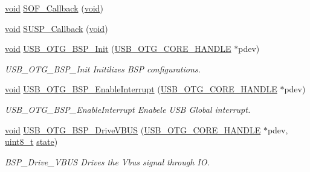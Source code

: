 \begin{DoxyCompactItemize}
\item 
\hyperlink{group___n_a_m_e_ga18028b8badbf1ea7e704ccac3c488e82}{void} \hyperlink{group___p_i_o_s___u_s_b_gaa3a23e7d4ec85e79cf28841529f081be}{S\-O\-F\-\_\-\-Callback} (\hyperlink{group___n_a_m_e_ga18028b8badbf1ea7e704ccac3c488e82}{void})
\item 
\hyperlink{group___n_a_m_e_ga18028b8badbf1ea7e704ccac3c488e82}{void} \hyperlink{group___p_i_o_s___u_s_b_gac123415bdaa5f7dc62947bd086bccebd}{S\-U\-S\-P\-\_\-\-Callback} (\hyperlink{group___n_a_m_e_ga18028b8badbf1ea7e704ccac3c488e82}{void})
\item 
\hyperlink{group___n_a_m_e_ga18028b8badbf1ea7e704ccac3c488e82}{void} \hyperlink{group___p_i_o_s___u_s_b_gacffb89e4346b11dee704fe5a40326a1f}{U\-S\-B\-\_\-\-O\-T\-G\-\_\-\-B\-S\-P\-\_\-\-Init} (\hyperlink{group___u_s_b___c_o_r_e___exported___types_gaf76054c11eb8a3367907aad7ae700e80}{U\-S\-B\-\_\-\-O\-T\-G\-\_\-\-C\-O\-R\-E\-\_\-\-H\-A\-N\-D\-L\-E} $\ast$pdev)
\begin{DoxyCompactList}\small\item\em U\-S\-B\-\_\-\-O\-T\-G\-\_\-\-B\-S\-P\-\_\-\-Init Initilizes B\-S\-P configurations. \end{DoxyCompactList}\item 
\hyperlink{group___n_a_m_e_ga18028b8badbf1ea7e704ccac3c488e82}{void} \hyperlink{group___p_i_o_s___u_s_b_ga38bdd94d09d00f27d1343fdb0babdfa1}{U\-S\-B\-\_\-\-O\-T\-G\-\_\-\-B\-S\-P\-\_\-\-Enable\-Interrupt} (\hyperlink{group___u_s_b___c_o_r_e___exported___types_gaf76054c11eb8a3367907aad7ae700e80}{U\-S\-B\-\_\-\-O\-T\-G\-\_\-\-C\-O\-R\-E\-\_\-\-H\-A\-N\-D\-L\-E} $\ast$pdev)
\begin{DoxyCompactList}\small\item\em U\-S\-B\-\_\-\-O\-T\-G\-\_\-\-B\-S\-P\-\_\-\-Enable\-Interrupt Enabele U\-S\-B Global interrupt. \end{DoxyCompactList}\item 
\hyperlink{group___n_a_m_e_ga18028b8badbf1ea7e704ccac3c488e82}{void} \hyperlink{group___p_i_o_s___u_s_b_ga1a0b196001899cd61bc722d080ca8161}{U\-S\-B\-\_\-\-O\-T\-G\-\_\-\-B\-S\-P\-\_\-\-Drive\-V\-B\-U\-S} (\hyperlink{group___u_s_b___c_o_r_e___exported___types_gaf76054c11eb8a3367907aad7ae700e80}{U\-S\-B\-\_\-\-O\-T\-G\-\_\-\-C\-O\-R\-E\-\_\-\-H\-A\-N\-D\-L\-E} $\ast$pdev, \hyperlink{stdint_8h_aba7bc1797add20fe3efdf37ced1182c5}{uint8\-\_\-t} \hyperlink{posix_2posix_2pios__flashfs__logfs_8c_a13a6109e91ad12705df96a0f2743c630}{state})
\begin{DoxyCompactList}\small\item\em B\-S\-P\-\_\-\-Drive\-\_\-\-V\-B\-U\-S Drives the Vbus signal through I\-O. \end{DoxyCompactList}\item 

\end{DoxyCompactItemize}
